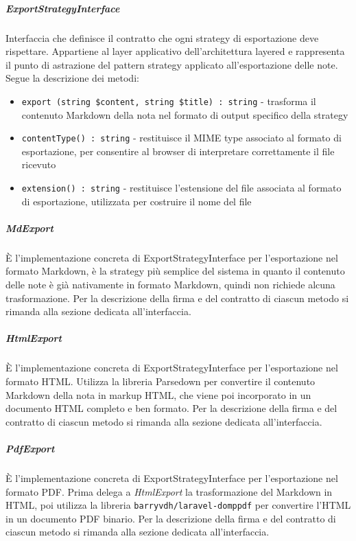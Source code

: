 \documentclass[a4paper,10pt]{article}
\begin{document}
\subparagraph{ExportStrategyInterface} Interfaccia che definisce il contratto che ogni strategy di esportazione deve rispettare. Appartiene al layer applicativo dell'architettura layered e rappresenta il punto di astrazione del pattern strategy applicato all'esportazione delle note. Segue la descrizione dei metodi:
\begin{itemize}
    \item \texttt{export (string \$content, string \$title) : string} - trasforma il contenuto Markdown della nota nel formato di output specifico della strategy
    \item \texttt{contentType() : string} - restituisce il MIME type associato al formato di esportazione, per consentire al browser di interpretare correttamente il file ricevuto
    \item \texttt{extension() : string} - restituisce l'estensione del file associata al formato di esportazione, utilizzata per costruire il nome del file
\end{itemize}
\subparagraph{MdExport} È l'implementazione concreta di ExportStrategyInterface per l'esportazione nel formato Markdown, è la strategy più semplice del sistema in quanto il contenuto delle note è già nativamente in formato Markdown, quindi non richiede alcuna trasformazione. Per la descrizione della firma e del contratto di ciascun metodo si rimanda alla sezione dedicata all'interfaccia.
\subparagraph{HtmlExport} È l'implementazione concreta di ExportStrategyInterface per l'esportazione nel formato HTML. Utilizza la libreria Parsedown per convertire il contenuto Markdown della nota in markup HTML, che viene poi incorporato in un documento HTML completo e ben formato. Per la descrizione della firma e del contratto di ciascun metodo si rimanda alla sezione dedicata all'interfaccia.
\subparagraph{PdfExport} È l'implementazione concreta di ExportStrategyInterface per l'esportazione nel formato PDF. Prima delega a \textit{HtmlExport} la trasformazione del Markdown in HTML, poi utilizza la libreria \texttt{barryvdh/laravel-domppdf} per convertire l'HTML in un documento PDF binario. Per la descrizione della firma e del contratto di ciascun metodo si rimanda alla sezione dedicata all'interfaccia.
\end{document}
